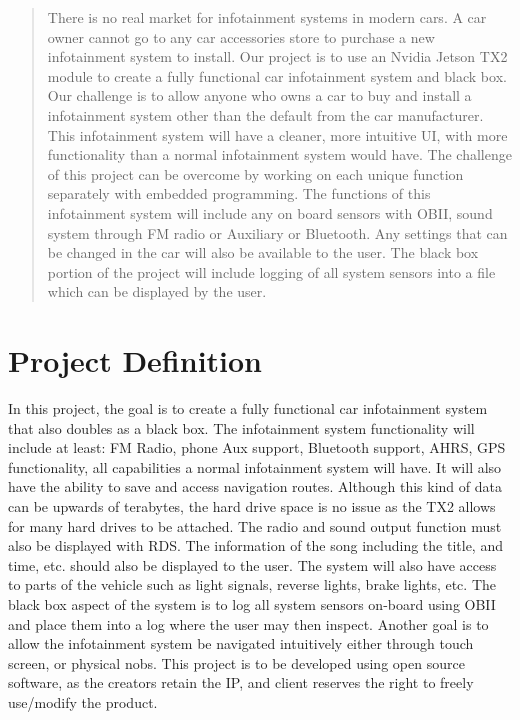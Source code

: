 \documentclass[onecolumn, draftclsnofoot,10pt, compsoc]{IEEEtran}
\begin{document}
\begin{titlepage}
\begin{singlespace}
\begin{abstract}
        	There is no real market for infotainment systems in modern cars. A car owner cannot go to any car accessories store to purchase a new infotainment system to install. Our project is to use an Nvidia Jetson TX2 module to create a fully functional car infotainment system and black box. Our challenge is to allow anyone who owns a car to buy and install a infotainment system other than the default from the car manufacturer. This infotainment system will have a cleaner, more intuitive UI, with more functionality than a normal infotainment system would have. The challenge of this project can be overcome by working on each unique function separately with embedded programming. The functions of this infotainment system will include any on board sensors with OBII, sound system through FM radio or Auxiliary or Bluetooth. Any settings that can be changed in the car will also be available to the user. The black box portion of the project will include logging of all system sensors into a file which can be displayed by the user.
        \end{abstract}     
    \end{singlespace}
\end{titlepage}
\newpage
{}
\tableofcontents
\clearpage

\section{Project Definition}
In this project, the goal is to create a fully functional car infotainment system that also doubles as a black box. The infotainment system functionality will include at least: FM Radio, phone Aux support, Bluetooth support, AHRS, GPS functionality, all capabilities a normal infotainment system will have. It will also have the ability to save and access navigation routes. Although this kind of data can be upwards of terabytes, the hard drive space is no issue as the TX2 allows for many hard drives to be attached. The radio and sound output function must also be displayed with RDS. The information of the song including the title, and time, etc. should also be displayed to the user. The system will also have access to parts of the vehicle such as light signals, reverse lights, brake lights, etc. The black box aspect of the system is to log all system sensors on-board using OBII and place them into a log where the user may then inspect. Another goal is to allow the infotainment system be navigated intuitively either through touch screen, or physical nobs. This project is to be developed using open source software, as the creators retain the IP, and client reserves the right to freely use/modify the product.
\end{document}
